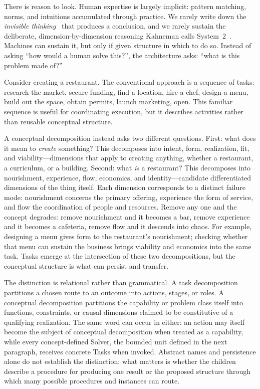\documentclass[11pt]{article}
\begin{document}
There is reason to look. Human expertise is largely implicit: pattern matching, norms, and intuitions accumulated through practice. We rarely write down the \emph{invisible thinking}~\cite{westerberg2025superintelligence, westerberg2026entangled, westerberg2026understanding} that produces a conclusion, and we rarely sustain the deliberate, dimension-by-dimension reasoning Kahneman calls System~2~\cite{kahneman2011}. Machines can sustain it, but only if given structure in which to do so. Instead of asking ``how would a human solve this?'', the architecture asks: ``what is this problem made of?''

Consider creating a restaurant. The conventional approach is a sequence of tasks: research the market, secure funding, find a location, hire a chef, design a menu, build out the space, obtain permits, launch marketing, open. This familiar sequence is useful for coordinating execution, but it describes activities rather than reusable conceptual structure.

A conceptual decomposition instead asks two different questions. First: what does it mean to \emph{create} something? This decomposes into intent, form, realization, fit, and viability---dimensions that apply to creating anything, whether a restaurant, a curriculum, or a building. Second: what \emph{is} a restaurant? This decomposes into nourishment, experience, flow, economics, and identity---candidate differentiated dimensions of the thing itself. Each dimension corresponds to a distinct failure mode: nourishment concerns the primary offering, experience the form of service, and flow the coordination of people and resources. Remove any one and the concept degrades: remove nourishment and it becomes a bar, remove experience and it becomes a cafeteria, remove flow and it descends into chaos. For example, designing a menu gives form to the restaurant's nourishment; checking whether that menu can sustain the business brings viability and economics into the same task. Tasks emerge at the intersection of these two decompositions, but the conceptual structure is what can persist and transfer.

The distinction is relational rather than grammatical. A task decomposition partitions a chosen route to an outcome into actions, stages, or roles. A conceptual decomposition partitions the capability or problem class itself into functions, constraints, or causal dimensions claimed to be constitutive of a qualifying realization. The same word can occur in either: an action may itself become the subject of conceptual decomposition when treated as a capability, while every concept-defined Solver, the bounded unit defined in the next paragraph, receives concrete Tasks when invoked. Abstract names and persistence alone do not establish the distinction; what matters is whether the children describe a procedure for producing one result or the proposed structure through which many possible procedures and instances can route.
\end{document}
